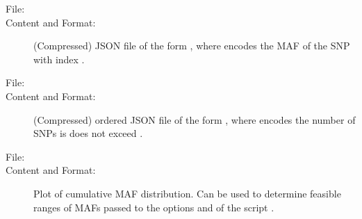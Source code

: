 \documentclass[a4paper,10pt,english]{sphinxhowto}
\begin{document}
\begin{description}
\begin{description}
\begin{description}
\end{description}

\item[{\sphinxstyleemphasis{MAFs:}}] \leavevmode\begin{description}
\item[{File:}] \leavevmode
{}

\item[{Content and Format:}] \leavevmode
(Compressed) JSON file of the form , where  encodes the MAF of
the SNP with index .

\end{description}

\item[{\sphinxstyleemphasis{Cumulative MAF distribution:}}] \leavevmode\begin{description}
\item[{File:}] \leavevmode
{}

\item[{Content and Format:}] \leavevmode
(Compressed) ordered JSON file of the form , where  encodes the
number of SNPs is does not exceed .

\end{description}

\item[{\sphinxstyleemphasis{Plot of Cumulative MAF distribution:}}] \leavevmode\begin{description}
\item[{File:}] \leavevmode
{}

\item[{Content and Format:}] \leavevmode
Plot of cumulative MAF distribution. Can be used to determine feasible ranges of MAFs passed to the options
 and  of the script .

\end{description}

\end{description}

\end{description}
\end{document}
